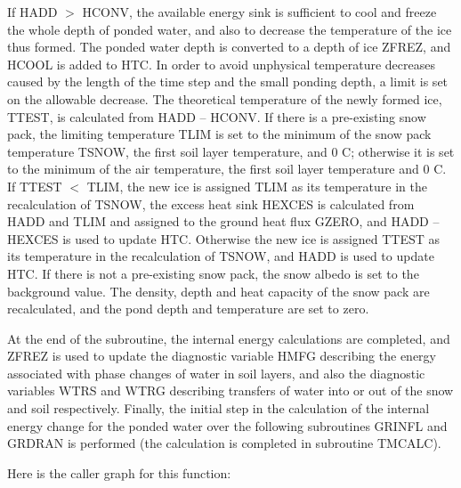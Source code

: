 If H\+A\+D\+D $>$ H\+C\+O\+N\+V, the available energy sink is sufficient to cool and freeze the whole depth of ponded water, and also to decrease the temperature of the ice thus formed. The ponded water depth is converted to a depth of ice Z\+F\+R\+E\+Z, and H\+C\+O\+O\+L is added to H\+T\+C. In order to avoid unphysical temperature decreases caused by the length of the time step and the small ponding depth, a limit is set on the allowable decrease. The theoretical temperature of the newly formed ice, T\+T\+E\+S\+T, is calculated from H\+A\+D\+D – H\+C\+O\+N\+V. If there is a pre-\/existing snow pack, the limiting temperature T\+L\+I\+M is set to the minimum of the snow pack temperature T\+S\+N\+O\+W, the first soil layer temperature, and 0 C; otherwise it is set to the minimum of the air temperature, the first soil layer temperature and 0 C. If T\+T\+E\+S\+T $<$ T\+L\+I\+M, the new ice is assigned T\+L\+I\+M as its temperature in the recalculation of T\+S\+N\+O\+W, the excess heat sink H\+E\+X\+C\+E\+S is calculated from H\+A\+D\+D and T\+L\+I\+M and assigned to the ground heat flux G\+Z\+E\+R\+O, and H\+A\+D\+D – H\+E\+X\+C\+E\+S is used to update H\+T\+C. Otherwise the new ice is assigned T\+T\+E\+S\+T as its temperature in the recalculation of T\+S\+N\+O\+W, and H\+A\+D\+D is used to update H\+T\+C. If there is not a pre-\/existing snow pack, the snow albedo is set to the background value. The density, depth and heat capacity of the snow pack are recalculated, and the pond depth and temperature are set to zero.

At the end of the subroutine, the internal energy calculations are completed, and Z\+F\+R\+E\+Z is used to update the diagnostic variable H\+M\+F\+G describing the energy associated with phase changes of water in soil layers, and also the diagnostic variables W\+T\+R\+S and W\+T\+R\+G describing transfers of water into or out of the snow and soil respectively. Finally, the initial step in the calculation of the internal energy change for the ponded water over the following subroutines G\+R\+I\+N\+F\+L and G\+R\+D\+R\+A\+N is performed (the calculation is completed in subroutine T\+M\+C\+A\+L\+C).

Here is the caller graph for this function\+:


